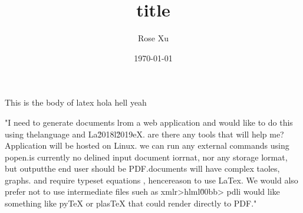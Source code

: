 \documentclass[12pt]{article}
\title{title}
\author{Rose Xu}
\date{\today}
\begin{document}
\maketitle

This is the body of latex hola hell yeah

"I need to generate documents lrom a web application and would like to do this using the\nPython language and La\u2018l\u2019eX. are there any tools that will help me?\n\nEdit\nThis Application will be hosted on Linux. we can run any external commands using popen.\nthere is currently no delined input document iorrnat, nor any storage lormat, but output\nto the end user should be PDF.\n{}\nThese documents will have complex taoles, graphs. and require typeset equations , hence\nthe reason to use LaTex. We would also prefer not to use intermediate files sueh as xmlr\n\n>hlml\u00bb> pdl\n\nideally i would like something like pyTeX or plasTeX that could render directly to PDF."
\end{document}
